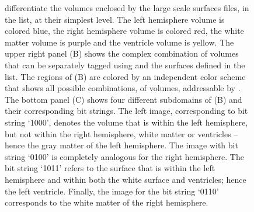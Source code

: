 \begin{figure}[t]
{	differentiate the volumes enclosed by the large scale surfaces 
	files, in the  list, at their simplest level.  
	The left hemisphere volume is colored blue, the right hemisphere volume 
	is colored red, the white matter volume is purple and the ventricle 
	volume is yellow.  The upper right panel (B) shows the complex 
	combination of volumes that can be separately tagged using 
	 and the surfaces defined in the 
	 list.  The regions of (B) are colored by an 
	independent color scheme that shows all possible combinations, of 
	volumes, addressable by .  The bottom panel (C) 
	shows four different subdomains of (B) and their corresponding bit 
	strings. The left image, corresponding to bit string `1000', denotes 
	the volume that is within the left hemisphere, but not within the right 
	hemisphere, white matter or ventricles -- hence the gray matter of the 
	left hemisphere.  The image with bit string `0100' is completely 
	analogous for the right hemisphere. The bit string `1011' refers to the 
	surface that is within the left hemisphere and within both the white 
	surface and ventricles; hence the left ventricle. Finally, the image 
	for the bit string `0110' corresponds to the white matter of the right 
	hemisphere. }
\label{fig:chp4:smap-example}
\end{figure}

